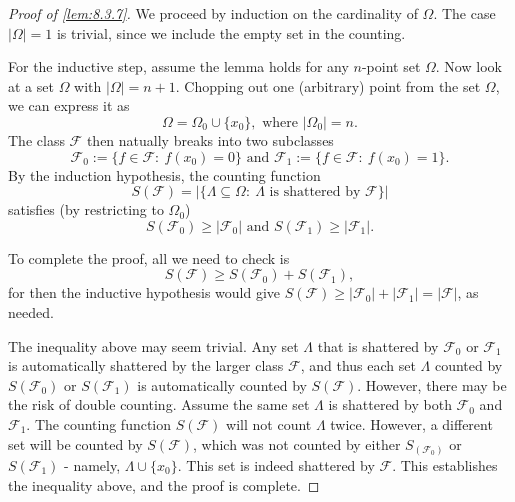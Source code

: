 \begin{proof}[Proof of \cref{lem:8.3.7}]
We proceed by induction on the cardinality of $\Omega$. The case $|\Omega| = 1$ is trivial, since we include the 
empty set in the counting. 

For the inductive step, assume the lemma holds for any $n$-point set $\Omega$. Now look at a set $\Omega$ with 
$|\Omega| = n + 1$. Chopping out one (arbitrary) point from the set $\Omega$, we can express it as 
\[ \Omega = \Omega_0 \cup \{x_0\}, \text{ where } |\Omega_0| = n. \]
The class $\mathcal{F}$ then natually breaks into two subclasses 
\[ \mathcal{F}_0 := \{ f \in \mathcal{F}: \ f(x_0) = 0 \} \text{ and } 
\mathcal{F}_1 := \{ f \in \mathcal{F}: \ f(x_0) = 1 \}. \]
By the induction hypothesis, the counting function 
\[ S(\mathcal{F}) = |\{ \Lambda \subseteq \Omega: \ \Lambda \text{ is shattered by } \mathcal{F} \}| \]
satisfies (by restricting to $\Omega_0$)
\[ S(\mathcal{F}_0) \geq |\mathcal{F}_0| \text{ and } S(\mathcal{F}_1) \geq |\mathcal{F}_1|. \]

To complete the proof, all we need to check is 
\[ S(\mathcal{F}) \geq S(\mathcal{F}_0) + S(\mathcal{F}_1), \]
for then the inductive hypothesis would give $S(\mathcal{F}) \geq |\mathcal{F}_0| + |\mathcal{F}_1|
= |\mathcal{F}|$, as needed.

The inequality above may seem trivial. Any set $\Lambda$ that is shattered by $\mathcal{F}_0$ or $\mathcal{F}_1$ 
is automatically shattered by the larger class $\mathcal{F}$, and thus each set $\Lambda$ counted by 
$S(\mathcal{F}_0)$ or $S(\mathcal{F}_1)$ is automatically counted by $S(\mathcal{F})$. However, there may be 
the risk of double counting. Assume the same set $\Lambda$ is shattered by both $\mathcal{F}_0$ and 
$\mathcal{F}_1$. The counting function $S(\mathcal{F})$ will not count $\Lambda$ twice. However, a different set 
will be counted by $S(\mathcal{F})$, which was not counted by either $S_(\mathcal{F}_0)$ or $S(\mathcal{F}_1)$ - 
namely, $\Lambda \cup \{x_0\}$. This set is indeed shattered by $\mathcal{F}$. This establishes the inequality 
above, and the proof is complete.
\end{proof}

